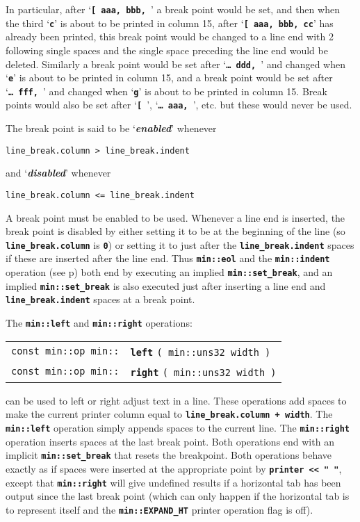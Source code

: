 \documentclass[12pt]{article}
\makeatletter
\newcommand{\TT}[1]{{\tt \bfseries #1}}
\newcommand{\mkey}[2]{{\bf \em #1}\index{#1!#2}}
\newcommand{\ttindex}[1]{\index{#1@{\tt #1}}}
\newcommand{\pagref}[1]{p\pageref{#1}}
\newcommand{\EOL}{\penalty \exhyphenpenalty}
\newenvironment{indpar}[1][0.3in]%
	{\begin{list}{}%
		     {\setlength{\itemsep}{0in}%
		      \setlength{\topsep}{0in}%
		      \setlength{\parsep}{1ex}%
		      \setlength{\labelwidth}{#1}%
		      \setlength{\leftmargin}{#1}%
		      \addtolength{\leftmargin}{\labelsep}}%
	 \item}%
	{\end{list}}
\newcommand{\LABEL}[1]{\label{#1}}
\newcommand{\MINKEY}[1]%
	   {\TT{#1}\ttindex{min::#1}\ttindex{#1}}
\makeatother
\begin{document}
In particular, after `\TT{[~aaa,~bbb,~}' a break point would be set,
and then when the third `\TT{c}' is about to be printed in column 15,
after `\TT{[~aaa,~bbb,~cc}' has already been printed, this
break point would be changed to a line end with 2 following single
spaces and the single space preceding the line end would be deleted.  Similarly
a break point would be set after `\TT{\ldots~ddd,~}' and changed
when `\TT{e}' is about to be printed in column 15, and a break
point would be set after `\TT{\ldots~fff,~}' and changed
when `\TT{g}' is about to be printed in column 15.  Break points
would also be set after `\TT{[~}', `\TT{\ldots~aaa,~}', etc. but
these would never be used.

The break point is said to be `\mkey{enabled}{break point}' whenever
\begin{center}
\tt line\_break.column > line\_break.indent
\end{center}
and `\mkey{disabled}{break point}' whenever
\begin{center}
\tt line\_break.column <= line\_break.indent
\end{center}
A break point must be enabled to be used.
Whenever a line end is inserted, the break point is
disabled by either setting it to be at the beginning of the line
(so \TT{line\_\EOL break.column} is \TT{0}) or setting it to
just after the \TT{line\_\EOL break.indent} spaces
if these are inserted after the line end.
Thus \TT{min::\EOL eol} and the \TT{min::\EOL indent} operation
(see \pagref{MIN::INDENT}) both end by executing
an implied \TT{min::\EOL set\_\EOL break},
and an implied \TT{min::\EOL set\_\EOL break}
is also executed just after inserting a line end
and \TT{line\_\EOL break.indent} spaces at a break point.

The \TT{min::left} and \TT{min::right} operations:

\begin{indpar}[1em]\begin{tabular}{r@{}l}
\verb|const min::op min::| & \MINKEY{left} \verb|( min::uns32 width )|
\LABEL{MIN::LEFT} \\
\verb|const min::op min::| & \MINKEY{right} \verb|( min::uns32 width )|
\LABEL{MIN::RIGHT} \\
\end{tabular}\end{indpar}

can be used to left or right adjust text in a line.
These operations add spaces to make the current printer column
equal to \TT{line\_\EOL break.column + width}.
The \TT{min::\EOL left} operation simply appends spaces to the
current line.  The \TT{min::\EOL right} operation inserts spaces
at the last break point.  Both operations end with an implicit
\TT{min::\EOL set\_\EOL break} that resets the breakpoint.
Both operations behave exactly as if spaces were inserted at the
appropriate point by \TT{printer <{}< "~"}, except that
\TT{min::right} will give undefined results if a horizontal
tab has been output since the last break point (which can only
happen if the horizontal tab is to represent itself and the
\TT{min::\EOL EXPAND\_\EOL HT} printer operation flag is off).
\end{document}
